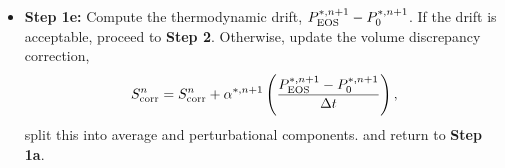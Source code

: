 \documentclass[final]{siamltex}
\def\wb {{\bf w}}
\begin{document}
\begin{itemize}
{\bf Step 1d-3:} Update the temperature and enthalpy using
\begin{equation}
T^{*,n+1,l+1} = T^{*,n+1,l} + \delta T, \quad h^{*,n+1,l+1} = h(\wb^{*,n+1},T^{*,n+1,l+1}).
\end{equation}
If $l=l_{\rm max}$, set $(h,T)^{*,n+1} = (h,T)^{*,n+1,l+1}$ and proceed to {\bf Step 1e}.\\
\item {\bf Step 1e:} Compute the thermodynamic drift, $P_{\rm EOS}^{*,n+1} - P_0^{*,n+1}$.
If the drift is acceptable, proceed to {\bf Step 2}.  Otherwise,
update the volume discrepancy correction,
\begin{equation}
S_{\rm corr}^n = S_{\rm corr}^n + \alpha^{*,n+1}\left(\frac{P_{\rm EOS}^{*,n+1} - P_0^{*,n+1}}{\Delta t}\right),
\end{equation}
split this into average and perturbational components.
and return to {\bf Step 1a}.\\
\end{itemize}
\end{document}
